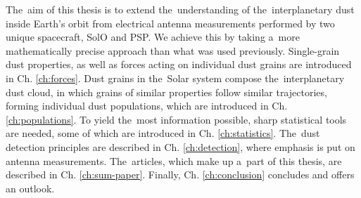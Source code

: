 The~aim of this thesis is to extend the~understanding of the~interplanetary dust inside Earth's orbit from electrical antenna measurements performed by two unique spacecraft, SolO and PSP. We achieve this by taking a~more mathematically precise approach than what was used previously. Single-grain dust properties, as well as forces acting on individual dust grains are introduced in Ch. \ref{ch:forces}. Dust grains in the~Solar system compose the~interplanetary dust cloud, in which grains of similar properties follow similar trajectories, forming individual dust populations, which are introduced in Ch. \ref{ch:populations}. To yield the~most information possible, sharp statistical tools are needed, some of which are introduced in Ch. \ref{ch:statistics}. The~dust detection principles are described in Ch. \ref{ch:detection}, where emphasis is put on antenna measurements. The~articles, which make up a~part of this thesis, are described in Ch. \ref{ch:sum-paper}. Finally, Ch. \ref{ch:conclusion} concludes and offers an outlook.